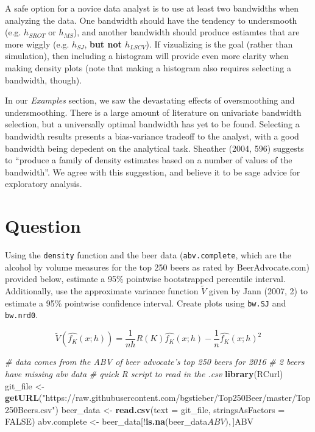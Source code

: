 \documentclass[]{article}
\newenvironment{Shaded}{\begin{snugshade}}{\end{snugshade}}
\newcommand{\KeywordTok}[1]{\textcolor[rgb]{0.13,0.29,0.53}{\textbf{{#1}}}}
\newcommand{\DataTypeTok}[1]{\textcolor[rgb]{0.13,0.29,0.53}{{#1}}}
\newcommand{\StringTok}[1]{\textcolor[rgb]{0.31,0.60,0.02}{{#1}}}
\newcommand{\CommentTok}[1]{\textcolor[rgb]{0.56,0.35,0.01}{\textit{{#1}}}}
\newcommand{\OtherTok}[1]{\textcolor[rgb]{0.56,0.35,0.01}{{#1}}}
\newcommand{\NormalTok}[1]{{#1}}
\begin{document}
A safe option for a novice data analyst is to use at least two
bandwidths when analyzing the data. One bandwidth should have the
tendency to undersmooth (e.g. \(h_{SROT}\) or \(h_{MS}\)), and another
bandwidth should produce estiamtes that are more wiggly (e.g.
\(h_{SJ}\), \textbf{but not \(h_{LSCV}\)}). If vizualizing is the goal
(rather than simulation), then including a histogram will provide even
more clarity when making density plots (note that making a histogram
also requires selecting a bandwidth, though).

In our \emph{Examples} section, we saw the devastating effects of
oversmoothing and undersmoothing. There is a large amount of literature
on univariate bandwidth selection, but a universally optimal bandwidth
has yet to be found. Selecting a bandwidth results presents a
bias-variance tradeoff to the analyst, with a good bandwidth being
depedent on the analytical task. Sheather (2004, 596) suggests to
``produce a family of density estimates based on a number of values of
the bandwidth''. We agree with this suggestion, and believe it to be
sage advice for exploratory analysis.

\section{Question}\label{question}

Using the \texttt{density} function and the beer data
(\texttt{abv.complete}, which are the alcohol by volume measures for the
top 250 beers as rated by BeerAdvocate.com) provided below, estimate a
95\% pointwise bootstrapped percentile interval. Additionally, use the
approximate variance function \(\tilde{V}\) given by Jann (2007, 2) to
estimate a 95\% pointwise confidence interval. Create plots using
\texttt{bw.SJ} and \texttt{bw.nrd0}.

\[\tilde{V}\left(\widehat{f_K}(x;h)\right) = \frac{1}{nh}R(K) \widehat{f_K}(x;h) - \frac{1}{n} \widehat{f_K}(x;h)^2\]

\begin{Shaded}
\begin{Highlighting}[]
\CommentTok{# data comes from the ABV of beer advocate's top 250 beers for 2016}
\CommentTok{# 2 beers have missing abv data}
\CommentTok{# quick R script to read in the .csv}
\KeywordTok{library}\NormalTok{(RCurl)}
\NormalTok{git_file <-}\StringTok{ }
\KeywordTok{getURL}\NormalTok{(}\StringTok{"https://raw.githubusercontent.com/bgstieber/Top250Beer/master/Top250Beers.csv"}\NormalTok{)}
\NormalTok{beer_data <-}\StringTok{ }\KeywordTok{read.csv}\NormalTok{(}\DataTypeTok{text =} \NormalTok{git_file, }\DataTypeTok{stringsAsFactors =} \OtherTok{FALSE}\NormalTok{)}
\NormalTok{abv.complete <-}\StringTok{ }\NormalTok{beer_data[!}\KeywordTok{is.na}\NormalTok{(beer_data$ABV), ]$ABV}
\end{Highlighting}
\end{Shaded}
\end{document}
